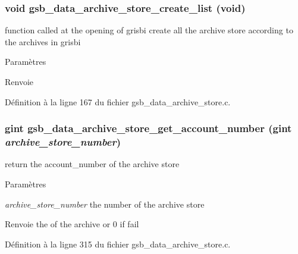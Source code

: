\subsubsection[{gsb\_\-data\_\-archive\_\-store\_\-create\_\-list}]{\setlength{\rightskip}{0pt plus 5cm}void gsb\_\-data\_\-archive\_\-store\_\-create\_\-list (void)}\label{gsb__data__archive__store_8c_af1c48e5ac4d5590dc16f386bcfb10391}
function called at the opening of grisbi create all the archive store according to the archives in grisbi


\begin{DoxyParams}{Paramètres}
\item[{\em }]\end{DoxyParams}
\begin{DoxyReturn}{Renvoie}

\end{DoxyReturn}


Définition à la ligne 167 du fichier gsb\_\-data\_\-archive\_\-store.c.

\subsubsection[{gsb\_\-data\_\-archive\_\-store\_\-get\_\-account\_\-number}]{\setlength{\rightskip}{0pt plus 5cm}gint gsb\_\-data\_\-archive\_\-store\_\-get\_\-account\_\-number (gint {\em archive\_\-store\_\-number})}\label{gsb__data__archive__store_8c_af8cce1446aecd71b0622144006b3916d}
return the account\_\-number of the archive store


\begin{DoxyParams}{Paramètres}
\item[{\em archive\_\-store\_\-number}]the number of the archive store\end{DoxyParams}
\begin{DoxyReturn}{Renvoie}
the of the archive or 0 if fail 
\end{DoxyReturn}


Définition à la ligne 315 du fichier gsb\_\-data\_\-archive\_\-store.c.

